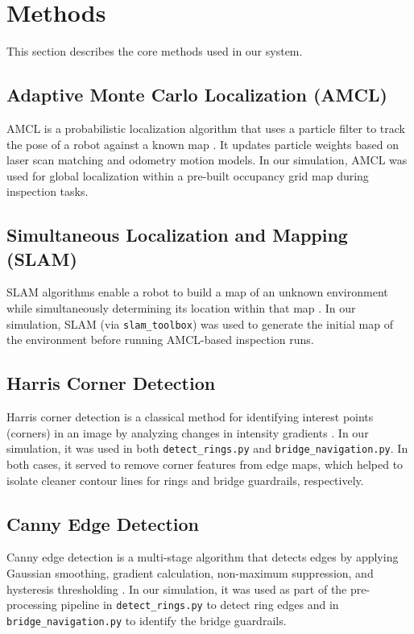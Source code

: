 \documentclass[a4paper]{article}
\begin{document}
\section{Methods}
This section describes the core methods used in our system.

\subsection{Adaptive Monte Carlo Localization (AMCL)}
AMCL is a probabilistic localization algorithm that uses a particle filter to track the pose of a robot against a known map \cite{fox2003monte}. It updates particle weights based on laser scan matching and odometry motion models. In our simulation, AMCL was used for global localization within a pre-built occupancy grid map during inspection tasks.

\subsection{Simultaneous Localization and Mapping (SLAM)}
SLAM algorithms enable a robot to build a map of an unknown environment while simultaneously determining its location within that map \cite{durrant}. In our simulation, SLAM (via \texttt{slam\_toolbox}) was used to generate the initial map of the environment before running AMCL-based inspection runs.

\subsection{Harris Corner Detection}
Harris corner detection is a classical method for identifying interest points (corners) in an image by analyzing changes in intensity gradients \cite{harris1988combined}. In our simulation, it was used in both \texttt{detect\_rings.py} and \texttt{bridge\_navigation.py}. In both cases, it served to remove corner features from edge maps, which helped to isolate cleaner contour lines for rings and bridge guardrails, respectively.

\subsection{Canny Edge Detection}
Canny edge detection is a multi-stage algorithm that detects edges by applying Gaussian smoothing, gradient calculation, non-maximum suppression, and hysteresis thresholding \cite{canny}. In our simulation, it was used as part of the pre-processing pipeline in \texttt{detect\_rings.py} to detect ring edges and in \texttt{bridge\_navigation.py} to identify the bridge guardrails.
\end{document}
